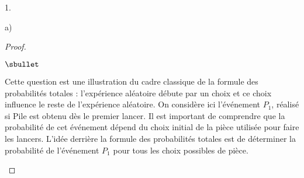 \begin{noliste}{1.}
\begin{noliste}{a)}
\begin{proof}
\begin{noliste}{$\sbullet$}
    \end{noliste}
      \begin{remark}
        Cette question est une illustration du cadre classique de la
        formule des probabilités totales : l'expérience aléatoire
        débute par un choix et ce choix influence le reste de
        l'expérience aléatoire. On considère ici l'événement $P_1$,
        réalisé si Pile est obtenu dès le premier lancer. Il est
        important de comprendre que la probabilité de cet événement
        dépend du choix initial de la pièce utilisée pour faire les
        lancers. L'idée derrière la formule des probabilités totales
        est de déterminer la probabilité de l'événement $P_1$ pour tous
        les choix possibles de pièce.\\

\end{remark}
\end{proof}
\end{noliste}
\end{noliste}
